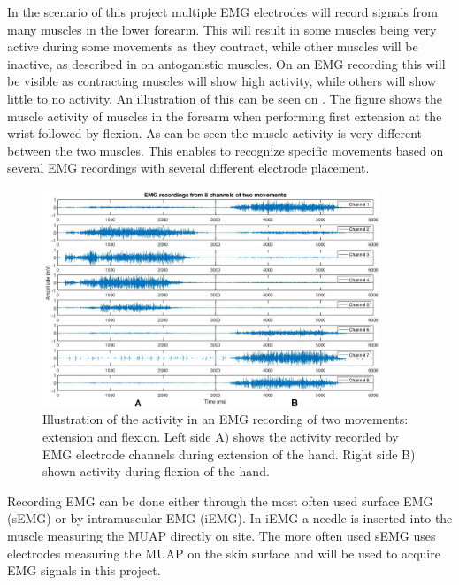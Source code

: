 In the scenario of this project multiple EMG electrodes will record signals from many muscles in the lower forearm. This will result in some muscles being very active during some movements as they contract, while other muscles will be inactive, as described in  on antoganistic muscles. On an EMG recording this will be visible as contracting muscles will show high activity, while others will show little to no activity. An illustration of this can be seen on . The figure shows the muscle activity of muscles in the forearm when performing first extension at the wrist followed by flexion. As can be seen the muscle activity is very different between the two muscles. This enables to recognize specific movements based on several EMG recordings with several different electrode placement. 

\begin{figure}[H] 
	\includegraphics[width=0.9\textwidth]{figures/xBackground/EMGactivityExtensionFlexion}
	\caption{Illustration of the activity in an EMG recording of two movements: extension and flexion. Left side A) shows the activity recorded by EMG electrode channels during extension of the hand. Right side B) shown activity during flexion of the hand.}
	\label{fig:EMGactivityExtensionFlexion}
\end{figure}


Recording EMG can be done either through the most often used surface EMG (sEMG) or by intramuscular EMG (iEMG). In iEMG a needle is inserted into the muscle measuring the MUAP directly on site. The more often used sEMG uses electrodes measuring the MUAP on the skin surface and will be used to acquire EMG signals in this project. \cite{Cram2012} 
